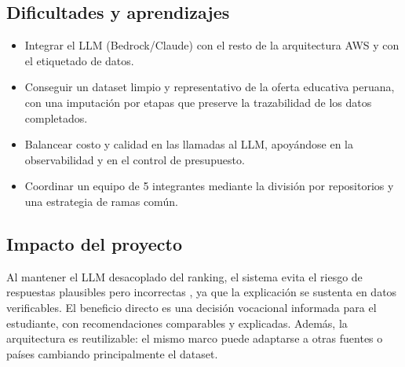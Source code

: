 \subsection{Dificultades y aprendizajes}

\begin{itemize}[noitemsep]
  \item Integrar el LLM (Bedrock/Claude) con el resto de la arquitectura AWS y
        con el etiquetado de datos.
  \item Conseguir un dataset limpio y representativo de la oferta educativa
        peruana, con una imputaci\'on por etapas que preserve la trazabilidad de
        los datos completados.
  \item Balancear costo y calidad en las llamadas al LLM, apoy\'andose en la
        observabilidad y en el control de presupuesto.
  \item Coordinar un equipo de 5 integrantes mediante la divisi\'on por
        repositorios y una estrategia de ramas com\'un.
\end{itemize}

\subsection{Impacto del proyecto}

Al mantener el LLM desacoplado del ranking, el sistema evita el riesgo de
respuestas plausibles pero incorrectas \cite{bender2021}, ya que la explicaci\'on
se sustenta en datos verificables. El beneficio directo es una decisi\'on
vocacional informada para el estudiante, con recomendaciones comparables y
explicadas. Adem\'as, la arquitectura es reutilizable: el mismo marco puede
adaptarse a otras fuentes o pa\'ises cambiando principalmente el dataset.
